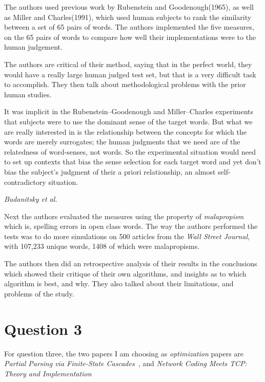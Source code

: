 \documentclass{article}
\numberwithin{equation}{section} %
\numberwithin{figure}{section} %
\numberwithin{table}{section} %
\begin{document}
The authors used previous work by Rubenstein and Goodenough(1965), as well as Miller and Charles(1991), which used human subjects to rank the similarity between a set of 65 pairs of words.  The authors implemented the five measures, on the 65 pairs of words to compare how well their implementations were to the human judgement.  

The authors are critical of their method, saying that in the perfect world, they would have a really large human judged test set, but that is a very difficult task to accomplish.  They then talk about methodological problems with the prior human studies.

\begin{shadequote}
It was implicit in the Rubenstein–Goodenough and Miller–Charles experiments that subjects were to use the dominant sense of the target words. But what we are really interested in is the relationship between the concepts for which the words are merely surrogates; the human judgments that we need are of the relatedness of word-senses, not words. So the experimental situation would need to set up contexts that bias the sense selection for each target word and yet don’t bias the subject’s judgment of their a priori relationship, an almost self-contradictory situation.\par\emph{Budanitsky et al.~\cite{Budanitsky01semanticdistance}}
\end{shadequote}

Next the authors evaluated the measures using the property of \textit{malapropism} which is, spelling errors in open class words.  The way the authors performed the tests was to do more simulations on 500 articles from the \textit{Wall Street Journal}, with 107,233 unique words, 1408 of which were malapropisms.  

The authors then did an retrospective analysis of their results in the conclusions which showed their critique of their own algorithms, and insights as to which algorithm is best, and why.  They also talked about their limitations, and problems of the study.

\section{Question 3}
For question three, the two papers I am choosing as \textit{optimization} papers are \textit{Partial Parsing via Finite-State Cascades}~\cite{Abney:1996:PPV:974697.974705}, and \textit{Network Coding Meets TCP: Theory and Implementation}
\end{document}
